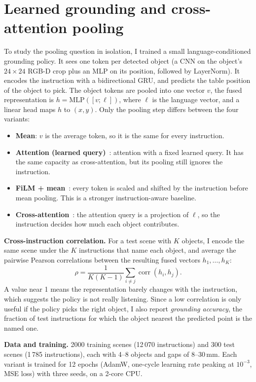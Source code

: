 \documentclass[10pt,a4paper]{article}
\begin{document}
\section{Learned grounding and cross-attention pooling}
To study the pooling question in isolation, I trained a small language-conditioned
grounding policy. It sees one token per detected object (a CNN on the object's
$24{\times}24$ RGB-D crop plus an MLP on its position, followed by
LayerNorm). It encodes the instruction with a bidirectional GRU, and predicts
the table position of the object to pick. The object tokens are pooled into one
vector $v$, the fused representation is $h=\mathrm{MLP}([v;\ell])$, where
$\ell$ is the language vector, and a linear head maps $h$ to $(x,y)$. Only the
pooling step differs between the four variants:
\begin{itemize}\itemsep0pt
\item \textbf{Mean}: $v$ is the average token, so it is the same for every instruction.
\item \textbf{Attention (learned query)}~\cite{settransformer}: attention with a
fixed learned query. It has the same capacity as cross-attention, but its
pooling still ignores the instruction.
\item \textbf{FiLM + mean}~\cite{film}: every token is scaled and shifted by
the instruction before mean pooling. This is a stronger instruction-aware
baseline.
\item \textbf{Cross-attention}~\cite{attention}: the attention query is a
projection of $\ell$, so the instruction decides how much each object
contributes.
\end{itemize}

\textbf{Cross-instruction correlation.} For a test scene with $K$ objects, I
encode the same scene under the $K$ instructions that name each object, and
average the pairwise Pearson correlations between the resulting fused
vectors $h_1,\dots,h_K$:
\[
\rho=\frac{1}{K(K-1)}\sum_{i\neq j}\operatorname{corr}(h_i,h_j).
\]
A value near 1 means the representation barely changes with the instruction,
which suggests the policy is not really listening. Since a low
correlation is only useful if the policy picks the right object, I also report
\emph{grounding accuracy}, the fraction of test instructions for which the
object nearest the predicted point is the named one.

\textbf{Data and training.} 2000 training scenes (12\,070 instructions) and
300 test scenes (1\,785 instructions), each with 4--8 objects and gaps of
8--30\,mm. Each variant is trained for 12 epochs (AdamW, one-cycle learning
rate peaking at $10^{-3}$, MSE loss) with three seeds, on a 2-core CPU.
\end{document}
